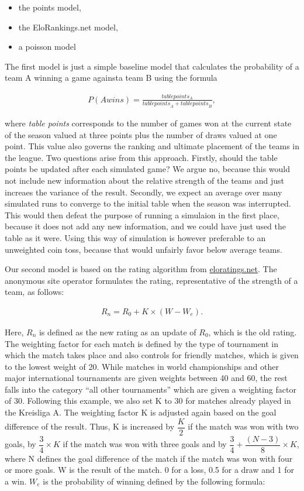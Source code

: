 \documentclass[12pt,a4paper]{article}
\begin{document}
\begin{itemize}
\item the points model,
\item the EloRankings.net model, 
\item a poisson model
\end{itemize}

The first model is just a simple baseline model that calculates the
probability of a team A winning a game againsta team B using the formula

\begin{align}
P(A wins) = \frac{table points_A}{{table points}_A + {table points}_B},
\end{align}

where \emph{table points} corresponds to the number of games won at the
current state of the season valued at three points plus the number of
draws valued at one point. This value also governs the ranking and
ultimate placement of the teams in the league. Two questions arise from
this approach. Firstly, should the table points be updated after each
simulated game? We argue no, because this would not include new
information about the relative strength of the teams and just increaes
the variance of the result. Secondly, we expect an average over many
simulated runs to converge to the initial table when the season was
interrupted. This would then defeat the purpose of running a simulaion
in the first place, because it does not add any new information, and we
could have just used the table as it were. Using this way of simulation
is however preferable to an unweighted coin toss, because that would
unfairly favor below average teams.

Our second model is based on the rating algorithm from
\href{eloratings.net/about}{eloratings.net}. The anonymous site operator
formulates the rating, representative of the strength of a team, as
follows:

\begin{align}
R_n = R_0 + K \times (W - W_e).
\end{align}

Here, \(R_n\) is defined as the new rating as an update of \(R_0\),
which is the old rating. The weighting factor for each match is defined
by the type of tournament in which the match takes place and also
controls for friendly matches, which is given to the lowest weight of
20. While matches in world championships and other major international
tournaments are given weights between 40 and 60, the rest falls into the
category \enquote{all other tournaments} which are given a weighting
factor of 30. Following this example, we also set K to 30 for matches
already played in the Kreisliga A. The weighting factor K is adjusted
again based on the goal difference of the result. Thus, K is increased
by \(\dfrac{K}{2}\) if the match was won with two goals, by
\(\dfrac{3}{4}\times K\) if the match was won with three goals and by
\(\dfrac{3}{4} + \dfrac{(N-3)}{8} \times K\), where N defines the goal
difference of the match if the match was won with four or more goals. W
is the result of the match. 0 for a loss, 0.5 for a draw and 1 for a
win. \(W_e\) is the probability of winning defined by the following
formula:
\end{document}
